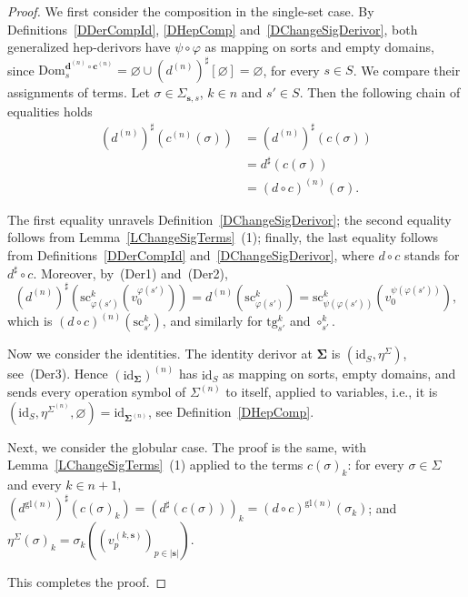 \documentclass[a4paper, reqno
]{amsart}
\newcommand{\bb}[1]{\ensuremath{\lvert #1 \rvert}}
\newcommand{\sig}[1]{\mathbf{#1}}             %
\newcommand{\Dom}{\mathrm{Dom}}
\newcommand{\id}{\mathrm{id}}
\newcommand{\gl}{\mathrm{gl}}                %
\newcommand{\src}{\mathrm{sc}}
\newcommand{\tgt}{\mathrm{tg}}
\theoremstyle{plain}
\theoremstyle{definition}
\begin{document}
\begin{proof}
We first consider the composition in the single-set case.
By Definitions~\ref{DDerCompId}, \ref{DHepComp} and~\ref{DChangeSigDerivor}, both generalized hep-derivors have $\psi\circ\varphi$ as mapping on sorts and empty domains, since $\Dom^{\mathbf{d}^{(n)}\circ\mathbf{c}^{(n)}}_{s}=\varnothing\cup(d^{(n)})^{\sharp}[\varnothing]=\varnothing$, for every $s\in S$.
We compare their assignments of terms.
Let $\sigma\in\Sigma_{\mathbf{s},s}$, $k\in n$ and $s'\in S$.
Then the following chain of equalities holds
\begin{align*}
(d^{(n)})^{\sharp}\left(c^{(n)}(\sigma)\right)
&=
(d^{(n)})^{\sharp}\left(c(\sigma)\right)
\tag{1}
\\&=
d^{\sharp}\left(c(\sigma)\right)
\tag{2}
\\&=
(d\circ c)^{(n)}(\sigma).
\tag{3}
\end{align*}

The first equality unravels Definition~\ref{DChangeSigDerivor}; the second equality follows from Lemma~\ref{LChangeSigTerms}~(1); finally, the last equality follows from Definitions~\ref{DDerCompId} and~\ref{DChangeSigDerivor}, where $d\circ c$ stands for $d^{\sharp}\circ c$.
Moreover, by~(Der1) and~(Der2),
$$
(d^{(n)})^{\sharp}\left(\src^{k}_{\varphi(s')}\left(v^{\varphi(s')}_{0}\right)\right)=d^{(n)}\left(\src^{k}_{\varphi(s')}\right)=\src^{k}_{\psi(\varphi(s'))}\left(v^{\psi(\varphi(s'))}_{0}\right),
$$
which is $(d\circ c)^{(n)}(\src^{k}_{s'})$, and similarly for $\tgt^{k}_{s'}$ and $\circ^{k}_{s'}$.

Now we consider the identities.
The identity derivor at $\sig{\Sigma}$ is $(\id_{S},\eta^{\Sigma})$, see~(Der3).
Hence $(\id_{\sig{\Sigma}})^{(n)}$ has $\id_{S}$ as mapping on sorts, empty domains, and sends every operation symbol of $\Sigma^{(n)}$ to itself, applied to variables, i.e., it is $(\id_{S},\eta^{\Sigma^{(n)}},\varnothing)=\id_{\sig{\Sigma}^{(n)}}$, see Definition~\ref{DHepComp}.

Next, we consider the globular case.
The proof is the same, with Lemma~\ref{LChangeSigTerms}~(1) applied to the terms $c(\sigma)_{k}$: for every $\sigma\in\Sigma$ and every $k\in n+1$, $(d^{\gl(n)})^{\sharp}(c(\sigma)_{k})=(d^{\sharp}(c(\sigma)))_{k}=(d\circ c)^{\gl(n)}(\sigma_{k})$; and $\eta^{\Sigma}(\sigma)_{k}=\sigma_{k}((v^{(k,\mathbf{s})}_{p})_{p\in\bb{\mathbf{s}}})$.

This completes the proof.
\end{proof}
\end{document}
